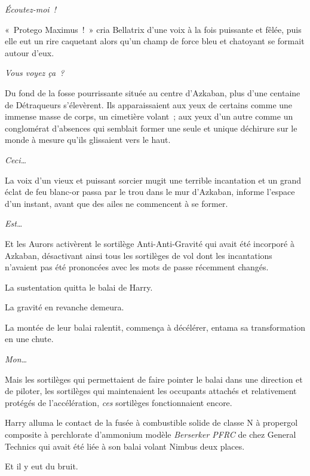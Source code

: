 \emph{Écoutez-moi~!}

«~Protego Maximus~!~» cria Bellatrix d'une voix à la fois puissante et fêlée, puis elle eut un rire caquetant alors qu'un champ de force bleu et chatoyant se formait autour d'eux.

\emph{Vous voyez ça~?}

Du fond de la fosse pourrissante située au centre d'Azkaban, plus d'une centaine de Détraqueurs s'élevèrent. Ils apparaissaient aux yeux de certains comme une immense masse de corps, un cimetière volant~; aux yeux d'un autre comme un conglomérat d'absences qui semblait former une seule et unique déchirure sur le monde à mesure qu'ils glissaient vers le haut.

\emph{Ceci…}

La voix d'un vieux et puissant sorcier mugit une terrible incantation et un grand éclat de feu blanc-or passa par le trou dans le mur d'Azkaban, informe l'espace d'un instant, avant que des ailes ne commencent à se former.

\emph{Est…}

Et les Aurors activèrent le sortilège Anti-Anti-Gravité qui avait été incorporé à Azkaban, désactivant ainsi tous les sortilèges de vol dont les incantations n'avaient pas été prononcées avec les mots de passe récemment changés.

La sustentation quitta le balai de Harry.

La gravité en revanche demeura.

La montée de leur balai ralentit, commença à décélérer, entama sa transformation en une chute.

\emph{Mon…}

Mais les sortilèges qui permettaient de faire pointer le balai dans une direction et de piloter, les sortilèges qui maintenaient les occupants attachés et relativement protégés de l'accélération, \emph{ces} sortilèges fonctionnaient encore.


Harry alluma le contact de la fusée à combustible solide de classe N à propergol composite à perchlorate d'ammonium modèle \emph{Berserker PFRC} de chez General Technics qui avait été liée à son balai volant Nimbus  deux places.

Et il y eut du bruit.
